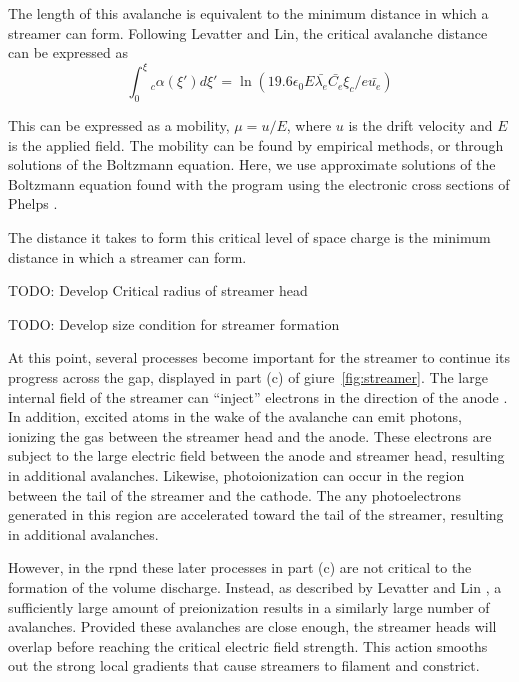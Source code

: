 The length of this avalanche is equivalent to the minimum distance in
which a streamer can form. Following Levatter and Lin, the critical
avalanche distance can be expressed as
\begin{equation}
  \int_0^\xi_c\alpha(\xi')d\xi' = \ln\left(19.6 \epsilon_0 E \bar{\lambda_e}
                                           \bar{C_e}\xi_c/e\bar{u_e}\right)
\end{equation}

This can be expressed as a mobility, $\mu = u/E$, where $u$ is the drift
velocity and $E$ is the applied field. The mobility can be found by
empirical methods, or through solutions of the Boltzmann equation. Here,
we use approximate solutions of the Boltzmann equation found with the
program  \cite{Hagelaar2005} using the electronic cross
sections of Phelps \cite{Phelps2002}.

The distance it takes to form this critical level of space charge is the
minimum distance in which a streamer can form.

TODO: Develop Critical radius of streamer head

TODO: Develop size condition for streamer formation

At this point, several processes become important for the streamer to
continue its progress across the gap, displayed in part (c) of
giure~\ref{fig:streamer}. The large internal field of the streamer can
``inject'' electrons in the direction of the anode \cite{Kunhardt1980}.
In addition, excited atoms in the wake of the avalanche can emit
photons, ionizing the gas between the streamer head and the anode. These
electrons are subject to the large electric field between the anode and
streamer head, resulting in additional avalanches. Likewise,
photoionization can occur in the region between the tail of the streamer
and the cathode. The any photoelectrons generated in this region are
accelerated toward the tail of the streamer, resulting in additional
avalanches.

However, in the \acs{rpnd} these later processes in part (c) are not
critical to the formation of the volume discharge. Instead, as described
by Levatter and Lin \cite{Levatter1980}, a sufficiently large amount of
preionization results in a similarly large number of avalanches.
Provided these avalanches are close enough, the streamer heads will
overlap before reaching the critical electric field strength. This
action smooths out the strong local gradients that cause streamers to
filament and constrict.

